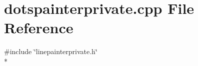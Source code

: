 \section{dotspainterprivate.\+cpp File Reference}
\label{bk3_2curve_2painters_2dotspainterprivate_8cpp}
{\ttfamily \#include \char`\"{}linepainterprivate.\+h\char`\"{}}\\*
